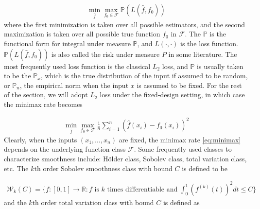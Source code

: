 \documentclass[a4paper]{article}
\newcommand{\RR}{\mathbb{R}}
\renewcommand{\cal}{\mathcal}
\begin{document}
\begin{align*}
\min_{\hat{f}}\max_{f_0\in\cal{F}} \mathbb{P}(L(\hat{f}, f_0))
\end{align*}
where the first minimization is taken over all possible estimators, and the second maximization is taken over all possible true function $f_0$ in $\cal{F}$. The $\mathbb{P}$ is the functional form for integral under measure $\mathbb{P}$, and $L(\cdot, \cdot)$ is the loss function. $\mathbb{P}(L(\hat{f}, f_0))$ is also called the risk under measure $P$ in some literature. The most frequently used loss function is the classical $L_2$ loss, and $\mathbb{P}$ is usually taken to be the $\mathbb{P}_x$, which is the true distribution of the input if assumed to be random, or $\mathbb{P}_n$, the empirical norm when the input $x$ is assumed to be fixed. For the rest of the section, we will adopt $L_2$ loss under the fixed-design setting, in which case the minimax rate becomes

\begin{align}
\min_{\hat{f}}\max_{f_0\in\cal{F}}\frac{1}{n}\sum_{i=1}^n(\hat{f}(x_i)-f_0(x_i))^2
\label{eq:minimax}
\end{align}
Clearly, when the inputs $(x_1,\ldots, x_n)$ are fixed, the minimax rate \eqref{eq:minimax} depends on the underlying function class $\cal{F}$. Some frequently used classes to characterize smoothness include: H\"older class, Sobolev class, total variation class, etc. The $k$th order Sobolev smoothness class with bound $C$ is defined to be 

\begin{align*}
\cal{W}_k(C) = \{f:[0, 1]\rightarrow \RR: f \text{ is $k$ times differentiable and } \int_0^1(f^{(k)}(t))^2dt\leq C\}
\end{align*}
and the $k$th order total variation class with bound $C$ is defined as
\end{document}
